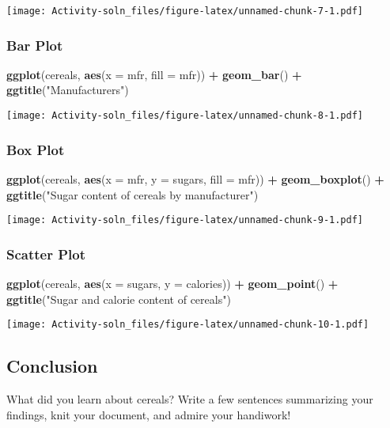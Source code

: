\documentclass[]{article}
\newenvironment{Shaded}{\begin{snugshade}}{\end{snugshade}}
\newcommand{\DataTypeTok}[1]{\textcolor[rgb]{0.13,0.29,0.53}{#1}}
\newcommand{\KeywordTok}[1]{\textcolor[rgb]{0.13,0.29,0.53}{\textbf{#1}}}
\newcommand{\NormalTok}[1]{#1}
\newcommand{\OperatorTok}[1]{\textcolor[rgb]{0.81,0.36,0.00}{\textbf{#1}}}
\newcommand{\StringTok}[1]{\textcolor[rgb]{0.31,0.60,0.02}{#1}}
\begin{document}
\texttt{[image: Activity-soln\_files/figure-latex/unnamed-chunk-7-1.pdf]}

\hypertarget{bar-plot}{%
\subsubsection{Bar Plot}\label{bar-plot}}

\begin{Shaded}
\begin{Highlighting}[]
\KeywordTok{ggplot}\NormalTok{(cereals, }\KeywordTok{aes}\NormalTok{(}\DataTypeTok{x =}\NormalTok{ mfr, }\DataTypeTok{fill =}\NormalTok{ mfr)) }\OperatorTok{+}\StringTok{ }
\StringTok{  }\KeywordTok{geom_bar}\NormalTok{() }\OperatorTok{+}
\StringTok{  }\KeywordTok{ggtitle}\NormalTok{(}\StringTok{"Manufacturers"}\NormalTok{)}
\end{Highlighting}
\end{Shaded}

\texttt{[image: Activity-soln\_files/figure-latex/unnamed-chunk-8-1.pdf]}

\hypertarget{box-plot}{%
\subsubsection{Box Plot}\label{box-plot}}

\begin{Shaded}
\begin{Highlighting}[]
\KeywordTok{ggplot}\NormalTok{(cereals, }\KeywordTok{aes}\NormalTok{(}\DataTypeTok{x =}\NormalTok{ mfr, }\DataTypeTok{y =}\NormalTok{ sugars, }\DataTypeTok{fill =}\NormalTok{ mfr)) }\OperatorTok{+}\StringTok{ }
\StringTok{  }\KeywordTok{geom_boxplot}\NormalTok{() }\OperatorTok{+}
\StringTok{  }\KeywordTok{ggtitle}\NormalTok{(}\StringTok{"Sugar content of cereals by manufacturer"}\NormalTok{)}
\end{Highlighting}
\end{Shaded}

\texttt{[image: Activity-soln\_files/figure-latex/unnamed-chunk-9-1.pdf]}

\hypertarget{scatter-plot}{%
\subsubsection{Scatter Plot}\label{scatter-plot}}

\begin{Shaded}
\begin{Highlighting}[]
\KeywordTok{ggplot}\NormalTok{(cereals, }\KeywordTok{aes}\NormalTok{(}\DataTypeTok{x =}\NormalTok{ sugars, }\DataTypeTok{y =}\NormalTok{ calories)) }\OperatorTok{+}\StringTok{ }
\StringTok{  }\KeywordTok{geom_point}\NormalTok{() }\OperatorTok{+}
\StringTok{  }\KeywordTok{ggtitle}\NormalTok{(}\StringTok{"Sugar and calorie content of cereals"}\NormalTok{)}
\end{Highlighting}
\end{Shaded}

\texttt{[image: Activity-soln\_files/figure-latex/unnamed-chunk-10-1.pdf]}

\hypertarget{conclusion}{%
\subsection{Conclusion}\label{conclusion}}

What did you learn about cereals? Write a few sentences summarizing your
findings, knit your document, and admire your handiwork!
\end{document}
